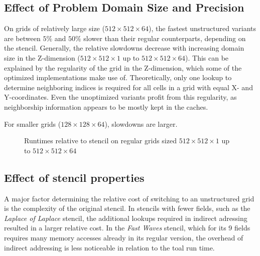 \subsection{Effect of Problem Domain Size and Precision}

On grids of relatively large size ($512\times 512\times 64$), the fastest unstructured variants are between $5\%$ and $50\%$ slower than their regular counterparts, depending on the stencil. Generally, the relative slowdowns decrease with increasing domain size in the Z-dimension ($512\times 512\times 1$ up to $512\times 512\times 64$). This can be explained by the regularity of the grid in the Z-dimension, which some of the optimized implementations make use of. Theoretically, only one lookup to determine neighboring indices is required for all cells in a grid with equal X- and Y-coordinates. Even the unoptimized variants profit from this regularity, as neighborship information appears to be mostly kept in the caches.

For smaller grids ($128\times 128\times 64$), slowdowns are larger.

\begin{figure}
	\caption{\label{fig:results-512-sizes}Runtimes relative to stencil on regular grids sized $512\times 512\times 1$ up to $512\times 512\times 64$}
\end{figure}


\subsection{Effect of stencil properties}

A major factor determining the relative cost of switching to an unstructured grid is the complexity of the original stencil. In stencils with fewer fields, such as the \emph{Laplace of Laplace} stencil, the additional lookups required in indirect adressing resulted in a larger relative cost. In the \emph{Fast Waves} stencil, which for its 9 fields requires many memory accesses already in its regular version, the overhead of indirect addressing is less noticeable in relation to the toal run time. 

